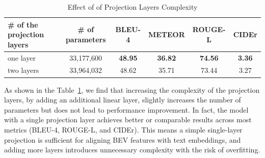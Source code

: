 \documentclass{article} %
\begin{document}
\begin{table}[h]
    \centering
    \small
    \begin{tabular}{lccccc}
        \toprule
        \textbf{\# of the projection layers} & \textbf{\# of parameters} & \textbf{BLEU-4} & \textbf{METEOR} & \textbf{ROUGE-L} & \textbf{CIDEr} \\
        \midrule
one layer
& 33,177,600 & \textbf{48.95} & \textbf{36.82} & \textbf{74.56} & \textbf{3.36} \\
two layers & 33,964,032 & 48.62 & 35.71 & 73.44& 3.27\\
        \bottomrule
    \end{tabular}
    \caption{Effect of of Projection Layers Complexity}
    \label{tab:proj-effect}
\end{table}


As shown in the Table~\ref{tab:proj-effect}, we find that increasing the complexity of the projection layers, by adding an additional linear layer, slightly increases the number of parameters but does not lead to performance improvement. In fact, the model with a single projection layer achieves better or comparable results across most metrics (BLEU-4, ROUGE-L, and CIDEr). This means a simple single-layer projection is sufficient for aligning BEV features with text embeddings, and adding more layers introduces unnecessary complexity with the risk of overfitting.



\clearpage
\end{document}
